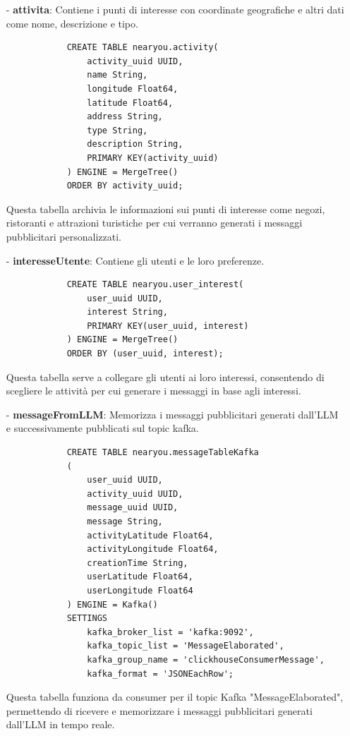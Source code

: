 \documentclass[10pt]{article}
\begin{document}
        \begin{itemize}

            \item[-] \textbf{attivita}: Contiene i punti di interesse con coordinate geografiche e altri dati come nome, descrizione e tipo.
            \begin{lstlisting}
            CREATE TABLE nearyou.activity(
                activity_uuid UUID,
                name String,
                longitude Float64,
                latitude Float64,
                address String,
                type String,
                description String,
                PRIMARY KEY(activity_uuid)
            ) ENGINE = MergeTree()
            ORDER BY activity_uuid;
            \end{lstlisting}
            Questa tabella archivia le informazioni sui punti di interesse come negozi, ristoranti e attrazioni turistiche per cui verranno generati i messaggi pubblicitari personalizzati.

            \item[-] \textbf{interesseUtente}: Contiene gli utenti e le loro preferenze.
            \begin{lstlisting}
            CREATE TABLE nearyou.user_interest(
                user_uuid UUID,
                interest String,
                PRIMARY KEY(user_uuid, interest)
            ) ENGINE = MergeTree()
            ORDER BY (user_uuid, interest);
            \end{lstlisting}
            Questa tabella serve a collegare gli utenti ai loro interessi, consentendo di scegliere le attività per cui generare i messaggi in base agli interessi.

            \item[-] \textbf{messageFromLLM}: Memorizza i messaggi pubblicitari generati dall'LLM e successivamente pubblicati sul topic kafka.
            \begin{lstlisting}
            CREATE TABLE nearyou.messageTableKafka
            (
                user_uuid UUID,
                activity_uuid UUID,
                message_uuid UUID,
                message String,
                activityLatitude Float64,
                activityLongitude Float64,
                creationTime String,
                userLatitude Float64,
                userLongitude Float64
            ) ENGINE = Kafka()
            SETTINGS 
                kafka_broker_list = 'kafka:9092',
                kafka_topic_list = 'MessageElaborated',
                kafka_group_name = 'clickhouseConsumerMessage',
                kafka_format = 'JSONEachRow';
            \end{lstlisting}
            Questa tabella funziona da consumer per il topic Kafka "MessageElaborated", permettendo di ricevere e memorizzare i messaggi pubblicitari generati dall'LLM in tempo reale.


\end{itemize}
\end{document}

